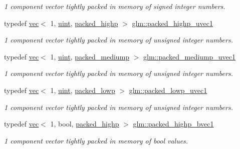 \begin{DoxyCompactItemize}
\begin{DoxyCompactList}\small\item\em 1 component vector tightly packed in memory of signed integer numbers. \end{DoxyCompactList}\item 
typedef \hyperlink{structglm_1_1vec}{vec}$<$ 1, \hyperlink{group__core__precision_ga4fd29415871152bfb5abd588334147c8}{uint}, \hyperlink{namespaceglm_a36ed105b07c7746804d7fdc7cc90ff25a8e8791ee77fe079b1291f710d88031bf}{packed\+\_\+highp} $>$ \hyperlink{group__gtc__type__aligned_ga160352f526bef94d143ccb525095936e}{glm\+::packed\+\_\+highp\+\_\+uvec1}
\begin{DoxyCompactList}\small\item\em 1 component vector tightly packed in memory of unsigned integer numbers. \end{DoxyCompactList}\item 
typedef \hyperlink{structglm_1_1vec}{vec}$<$ 1, \hyperlink{group__core__precision_ga4fd29415871152bfb5abd588334147c8}{uint}, \hyperlink{namespaceglm_a36ed105b07c7746804d7fdc7cc90ff25a9604654c3b137cd7898689fd34b25bc0}{packed\+\_\+mediump} $>$ \hyperlink{group__gtc__type__aligned_ga2fd382e54fcf213b330d448f83738636}{glm\+::packed\+\_\+mediump\+\_\+uvec1}
\begin{DoxyCompactList}\small\item\em 1 component vector tightly packed in memory of unsigned integer numbers. \end{DoxyCompactList}\item 
typedef \hyperlink{structglm_1_1vec}{vec}$<$ 1, \hyperlink{group__core__precision_ga4fd29415871152bfb5abd588334147c8}{uint}, \hyperlink{namespaceglm_a36ed105b07c7746804d7fdc7cc90ff25ac36a4bd74559be2c0b65bc48e5953b8b}{packed\+\_\+lowp} $>$ \hyperlink{group__gtc__type__aligned_ga992b281fc2e3bf15c09f491393045ebc}{glm\+::packed\+\_\+lowp\+\_\+uvec1}
\begin{DoxyCompactList}\small\item\em 1 component vector tightly packed in memory of unsigned integer numbers. \end{DoxyCompactList}\item 
typedef \hyperlink{structglm_1_1vec}{vec}$<$ 1, bool, \hyperlink{namespaceglm_a36ed105b07c7746804d7fdc7cc90ff25a8e8791ee77fe079b1291f710d88031bf}{packed\+\_\+highp} $>$ \hyperlink{group__gtc__type__aligned_ga00ef8acfca23dca78e1baa65bb5861ac}{glm\+::packed\+\_\+highp\+\_\+bvec1}
\begin{DoxyCompactList}\small\item\em 1 component vector tightly packed in memory of bool values. \end{DoxyCompactList}\item 

\end{DoxyCompactItemize}
